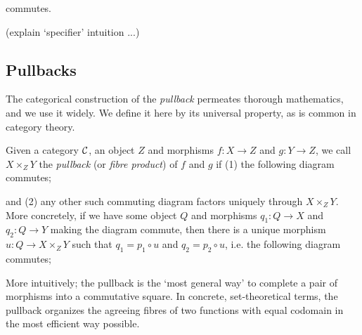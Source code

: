 \begin{figure}[ht!]
\centering
{}
\end{figure}
commutes.

(explain `specifier' intuition ...)

\subsection{Pullbacks}
The categorical construction of the \emph{pullback} permeates thorough mathematics, and we use it widely. We define it here by its universal property, as is common in category theory.

\begin{definition}[Pullback]
	Given a category $\mathcal{C}$, an object $Z$ and morphisms $f:X\to Z$ and $g:Y\to Z$, we call $X\times_{Z} Y$ the \emph{pullback} (or \emph{fibre product}) of $f$ and $g$ if (1) the following diagram commutes;

	\begin{center}
	\end{center}

	and (2) any other such commuting diagram factors uniquely through $X\times_Z Y$. More concretely, if we have some object $Q$ and morphisms $q_1:Q\to X$ and $q_2:Q\to Y$ making the diagram commute, then there is a unique morphism $u:Q\to X\times_Z Y$ such that $q_1 = p_1\circ u$ and $q_2 = p_2\circ u$, i.e. the following diagram commutes;

	\begin{center}
	\end{center}

\end{definition}

More intuitively; the pullback is the `most general way' to complete a pair of morphisms into a commutative square. In concrete, set-theoretical terms, the pullback organizes the agreeing fibres of two functions with equal codomain in the most efficient way possible.


